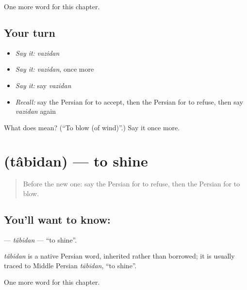 \begin{grammarlens}[title={What you've built}]
One more word for this chapter.
\end{grammarlens}

\subsection*{Your turn}
\begin{itemize}
\raggedright
  \item \emph{Say it:} \emph{vazidan}
  \item \emph{Say it:} \emph{vazidan}, once more
  \item \emph{Say it:} say \emph{vazidan}
  \item \emph{Recall:} say the Persian for to accept, then the Persian for to refuse, then say \emph{vazidan} again
\end{itemize}

\begin{tcolorbox}[breakable,colback=teal!4,colframe=teal!35!black,title={Before you move on}]
What does  mean? (\textquotedblleft{}To blow (of wind)\textquotedblright{}.) Say it once more.
\end{tcolorbox}
\section[\texorpdfstring{\fa{تابیدن} (tâbidan)}{تابیدن (tâbidan)}]{ (tâbidan) — to shine}

\label{lesson:FA-C184-tabidan}



\begin{quote}
Before the new one: say the Persian for to refuse, then the Persian for to blow.
\end{quote}

\subsection*{You'll want to know: }
\textbf{} — \emph{tâbidan} — \textquotedblleft{}to shine\textquotedblright{}.

\begin{cousinweb}
\emph{tâbidan} is a native Persian word, inherited rather than borrowed; it is usually traced to Middle Persian \emph{tābīdan}, \textquotedblleft{}to shine\textquotedblright{}.
\end{cousinweb}

\begin{grammarlens}[title={What you've built}]
One more word for this chapter.
\end{grammarlens}

